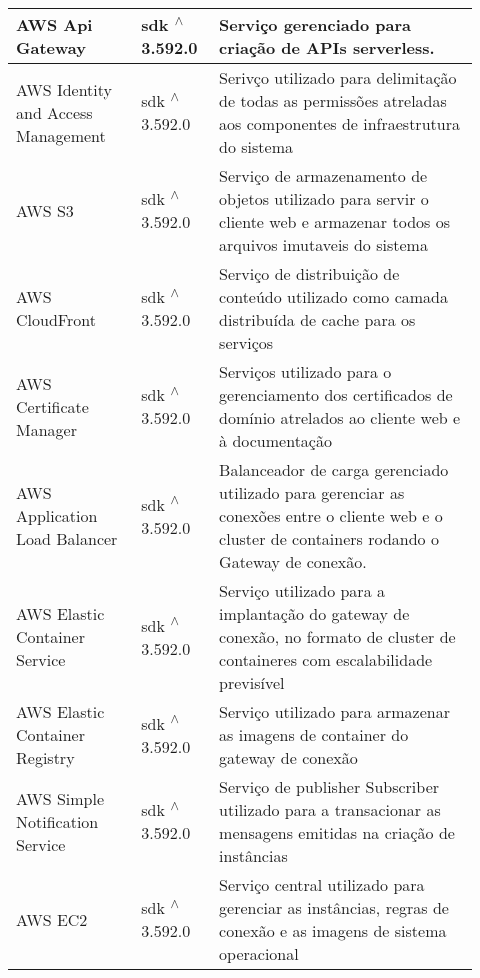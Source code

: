 \begin{longtable}{p{0.25\linewidth} p{0.15\linewidth} p{0.525\linewidth}}
\hline

AWS Api Gateway & sdk \textsuperscript{$\wedge$}3.592.0 & Serviço gerenciado para criação de APIs serverless. \\

\hline

AWS Identity and Access Management & sdk \textsuperscript{$\wedge$}3.592.0 & Serivço utilizado para delimitação de todas as permissões atreladas aos componentes de infraestrutura do sistema \\

\hline

AWS S3 & sdk \textsuperscript{$\wedge$}3.592.0 & Serviço de armazenamento de objetos utilizado para servir o cliente web e armazenar todos os arquivos imutaveis do sistema \\

\hline

AWS CloudFront & sdk \textsuperscript{$\wedge$}3.592.0 & Serviço de distribuição de conteúdo utilizado como camada distribuída de cache para os serviços \\

\hline

AWS Certificate Manager & sdk \textsuperscript{$\wedge$}3.592.0 & Serviços utilizado para o gerenciamento dos certificados de domínio atrelados ao cliente web e à documentação \\

\hline

AWS Application Load Balancer & sdk \textsuperscript{$\wedge$}3.592.0 & Balanceador de carga gerenciado utilizado para gerenciar as conexões entre o cliente web e o cluster de containers rodando o Gateway de conexão. \\

\hline

AWS Elastic Container Service & sdk \textsuperscript{$\wedge$}3.592.0 & Serviço utilizado para a implantação do gateway de conexão, no formato de cluster de containeres com escalabilidade previsível \\

\hline

AWS Elastic Container Registry & sdk \textsuperscript{$\wedge$}3.592.0 & Serviço utilizado para armazenar as imagens de container do gateway de conexão \\

\hline

AWS Simple Notification Service & sdk \textsuperscript{$\wedge$}3.592.0 & Serviço de publisher Subscriber utilizado para a transacionar as mensagens emitidas na criação de instâncias \\

\hline

AWS EC2 & sdk \textsuperscript{$\wedge$}3.592.0 & Serviço central utilizado para gerenciar as instâncias, regras de conexão e as imagens de sistema operacional \\

\hline

\end{longtable}

